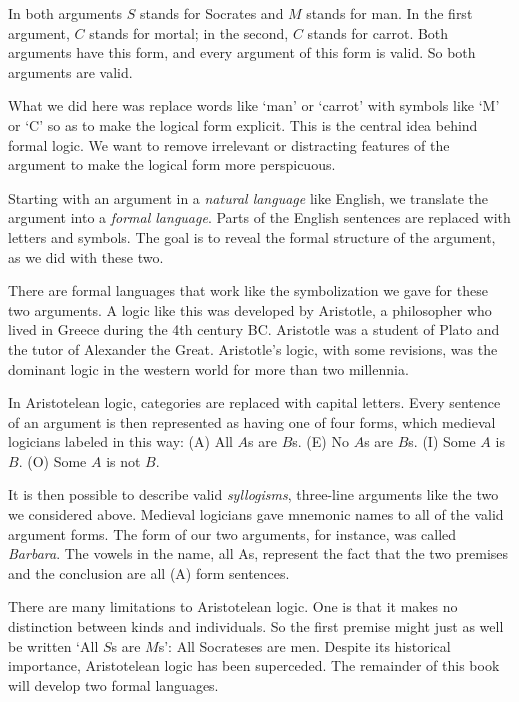 In both arguments $S$ stands for Socrates and $M$ stands for man. In the first argument, $C$ stands for mortal; in the second, $C$ stands for carrot. Both arguments have this form, and every argument of this form is valid. So both arguments are valid.


What we did here was replace words like `man' or `carrot' with symbols like `M' or `C' so as to make the logical form explicit. This is the central idea behind formal logic. We want to remove irrelevant or distracting features of the argument to make the logical form more perspicuous.



Starting with an argument in a \emph{natural language} like English, we translate the argument into a \emph{formal language}. Parts of the English sentences are replaced with letters and symbols. The goal is to reveal the formal structure of the argument, as we did with these two.

There are formal languages that work like the symbolization we gave for these two arguments. A logic like this was developed by Aristotle, a philosopher who lived in Greece during the 4th century BC. Aristotle was a student of Plato and the tutor of Alexander the Great. Aristotle's logic, with some revisions, was the dominant logic in the western world for more than two millennia.

In Aristotelean logic, categories are replaced with capital letters. Every sentence of an argument is then represented as having one of four forms, which medieval logicians labeled in this way: (A) All $A$s are $B$s. (E) No $A$s are $B$s. (I) Some $A$ is $B$. (O) Some $A$ is not $B$.

It is then possible to describe valid \emph{syllogisms}, three-line arguments like the two we considered above. Medieval logicians gave mnemonic names to all of the valid argument forms. The form of our two arguments, for instance, was called \emph{Barbara}. The vowels in the name, all As, represent the fact that the two premises and the conclusion are all (A) form sentences.

There are many limitations to Aristotelean logic. One is that it makes no distinction between kinds and individuals. So the first premise might just as well be written `All $S$s are $M$s': All Socrateses are men. Despite its historical importance, Aristotelean logic has been superceded. The remainder of this book will develop two formal languages.

